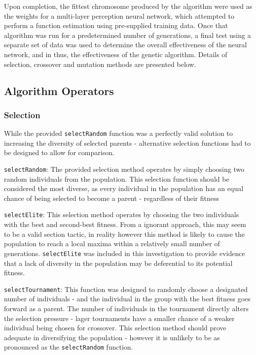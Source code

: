 		Upon completion, the fittest chromosome produced by the algorithm were used as the weights for a multi-layer perception neural network, which attempted to perform a function estimation using pre-supplied training data. Once that algorithm was run for a predetermined number of generations, a final test using a separate set of data was used to determine the overall effectiveness of the neural network, and in thus, the effectiveness of the genetic algorithm. Details of selection, crossover and mutation methods are presented below.  
			
	\subsection{Algorithm Operators}
		\subsubsection{Selection}
			While the provided \texttt{selectRandom} function was a perfectly valid solution to increasing the diversity of selected parents - alternative selection functions had to be designed to allow for comparison.
			
			\texttt{selectRandom}: The provided selection method operates by simply choosing two random individuals from the population. This selection function should be considered the most diverse, as every individual in the population has an equal chance of being selected to become a parent - regardless of their fitness
	
			\texttt{selectElite}: This selection method operates by choosing the two individuals with the best and second-best fitness. From a ignorant approach, this may seem to be a valid section tactic, in reality however this method is likely to cause the population to reach a local maxima within a relatively small number of generations. \texttt{selectElite} was included in this investigation to provide evidence that a lack of diversity in the population may be deferential to its potential fitness.
			
			\texttt{selectTournament}: This function was designed to randomly choose a designated number of individuals - and the individual in the group with the best fitness goes forward as a parent. The number of individuals in the tournament directly alters the selection pressure - lager tournaments have a smaller chance of a weaker individual being chosen for crossover. This selection method should prove adequate in diversifying the population - however it is unlikely to be as pronounced as the \texttt{selectRandom} function.
			
